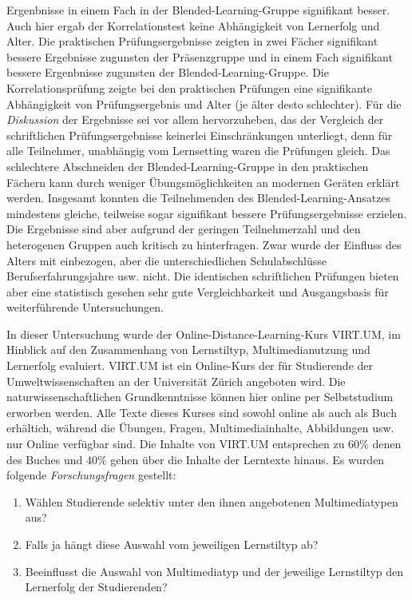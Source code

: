 \documentclass[12pt, bibliography=totoc]{scrartcl}
\begin{document}
Ergenbnisse in einem Fach in der Blended-Learning-Gruppe signifikant
besser. Auch hier ergab der Korrelationstest keine Abhängigkeit von
Lernerfolg und Alter. Die praktischen Prüfungsergebnisse zeigten in zwei
Fächer signifikant bessere Ergebnisse zugunsten der Präsenzgruppe und in
einem Fach signifikant bessere Ergenbnisse zugunsten der
Blended-Learning-Gruppe. Die Korrelationsprüfung zeigte bei den
praktischen Prüfungen eine signifikante Abhängigkeit von
Prüfungsergebnis und Alter (je älter desto schlechter). Für die
\emph{Diskussion} der Ergebnisse sei vor allem hervorzuheben, das der
Vergleich der schriftlichen Prüfungsergebnisse keinerlei Einschränkungen
unterliegt, denn für alle Teilnehmer, unabhängig vom Lernsetting waren
die Prüfungen gleich. Das schlechtere Abschneiden der
Blended-Learning-Gruppe in den praktischen Fächern kann durch weniger
Übungsmöglichkeiten an modernen Geräten erklärt werden. Insgesamt
konnten die Teilnehmenden des Blended-Learning-Ansatzes mindestens
gleiche, teilweise sogar signifikant bessere Prüfungsergebnisse
erzielen. Die Ergebnisse sind aber aufgrund der geringen Teilnehmerzahl
und den heterogenen Gruppen auch kritisch zu hinterfragen. Zwar wurde
der Einfluss des Alters mit einbezogen, aber die unterschiedlichen
Schulabschlüsse Berufserfahrungsjahre usw. nicht. Die identischen
schriftlichen Prüfungen bieten aber eine statistisch gesehen sehr gute
Vergleichbarkeit und Ausgangsbasis für weiterführende Untersuchungen.

\textbf{}

In dieser Untersuchung wurde der Online-Distance-Learning-Kurs VIRT.UM,
im Hinblick auf den Zusammenhang von Lernstiltyp, Multimedianutzung und
Lernerfolg evaluiert. VIRT.UM ist ein Online-Kurs der für Studierende
der Umweltwissenschaften an der Universität Zürich angeboten wird. Die
naturwissenschaftlichen Grundkenntnisse können hier online per
Selbststudium erworben werden. Alle Texte dieses Kurses sind sowohl
online als auch als Buch erhältich, während die Übungen, Fragen,
Multimediainhalte, Abbildungen usw. nur Online verfügbar sind. Die
Inhalte von VIRT.UM entsprechen zu 60\% denen des Buches und 40\% gehen
über die Inhalte der Lerntexte hinaus. Es wurden folgende
\emph{Forschungsfragen} gestellt:

\begin{enumerate}
\def\labelenumi{\arabic{enumi}.}
\itemsep1pt\parskip0pt
\item
  Wählen Studierende selektiv unter den ihnen angebotenen
  Multimediatypen aus?
\item
  Falls ja hängt diese Auswahl vom jeweiligen Lernstiltyp ab?
\item
  Beeinflusst die Auswahl von Multimediatyp und der jeweilige
  Lernstiltyp den Lernerfolg der Studierenden?
\end{enumerate}
\end{document}
